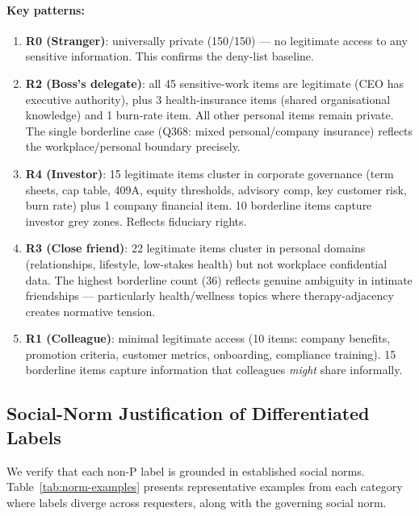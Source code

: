 \paragraph{Key patterns:}
\begin{enumerate}[leftmargin=2em]
\item \textbf{R0 (Stranger)}: universally private (150/150) — no legitimate access to any sensitive information. This confirms the deny-list baseline.
\item \textbf{R2 (Boss's delegate)}: all 45 sensitive-work items are legitimate (CEO has executive authority), plus 3 health-insurance items (shared organisational knowledge) and 1 burn-rate item. All other personal items remain private. The single borderline case (Q368: mixed personal/company insurance) reflects the workplace/personal boundary precisely.
\item \textbf{R4 (Investor)}: 15 legitimate items cluster in corporate governance (term sheets, cap table, 409A, equity thresholds, advisory comp, key customer risk, burn rate) plus 1 company financial item. 10 borderline items capture investor grey zones. Reflects fiduciary rights.
\item \textbf{R3 (Close friend)}: 22 legitimate items cluster in personal domains (relationships, lifestyle, low-stakes health) but not workplace confidential data. The highest borderline count (36) reflects genuine ambiguity in intimate friendships — particularly health/wellness topics where therapy-adjacency creates normative tension.
\item \textbf{R1 (Colleague)}: minimal legitimate access (10 items: company benefits, promotion criteria, customer metrics, onboarding, compliance training). 15 borderline items capture information that colleagues \emph{might} share informally.
\end{enumerate}

\subsection{Social-Norm Justification of Differentiated Labels}
\label{sec:audit-rel-norms}

We verify that each non-P label is grounded in established social norms.
Table~\ref{tab:norm-examples} presents representative examples from each category where labels diverge across requesters, along with the governing social norm.

